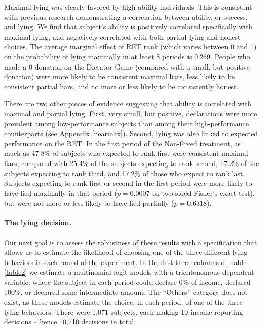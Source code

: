 \documentclass[12pt]{article}
\begin{document}
\par Maximal lying was clearly favored by high ability individuals.  This is consistent with previous research \citep{Schurretal2016,Vincentetal2015,DuchSolaz2017} demonstrating a correlation between ability, or success, and lying. We find that subject's ability is positively correlated specifically with maximal lying, and negatively correlated with both partial lying and honest choices. The average marginal effect of RET rank (which varies between 0 and 1) on the probability of lying maximally in at least 8 periods is 0.269.  People who made a 0 donation on the Dictator Game (compared with a small, but positive donation) were more likely to be consistent maximal liars, less likely to be consistent partial liars, and no more or less likely to be consistently honest. 

\par There are two other pieces of evidence suggesting that ability is correlated with maximal and partial lying. First, very small, but positive, declarations were more prevalent among low-performance subjects than among their high-performance counterparts (see Appendix \ref{nearmax}).  Second, lying was also linked to expected performance on the RET. In the first period of the Non-Fixed treatment, as much as 47.8\% of subjects who expected to rank first were consistent maximal liars, compared with 25.4\% of the subjects expecting to rank second, 17.2\% of the subjects expecting to rank third, and 17.2\% of those who expect to rank last.\footnotemark{} 
Subjects expecting to rank first or second in the first period were more likely to have lied maximally in that period ($p=0.0007$ on two-sided Fisher's exact test), but were not more or less likely to have lied partially ($p=0.6318$).\footnotemark{}
\label{stata:init_pred}

\paragraph{The lying decision.} Our next goal is to assess the robustness of these results with a specification that allows us to estimate the likelihood of choosing one of the three different lying behaviors in each round of the experiment. In the first three columns of Table \ref{table2} we estimate a multinomial logit models with a trichtonomous dependent variable: where the subject in each period could declare 0\% of income, declared 100\%, or declared some intermediate amount. The ``Others'' category does not exist, as these models estimate the choice, in each period, of one of the three lying behaviors. There were 1,071 subjects, each making 10 income reporting decisions -- hence 10,710 decisions in total.
\end{document}
